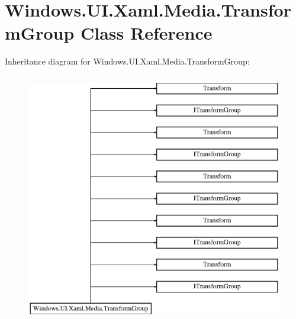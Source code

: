\hypertarget{class_windows_1_1_u_i_1_1_xaml_1_1_media_1_1_transform_group}{}\section{Windows.\+U\+I.\+Xaml.\+Media.\+Transform\+Group Class Reference}
\label{class_windows_1_1_u_i_1_1_xaml_1_1_media_1_1_transform_group}
Inheritance diagram for Windows.\+U\+I.\+Xaml.\+Media.\+Transform\+Group\+:\begin{figure}[H]
\begin{center}
\leavevmode
\includegraphics[height=11.000000cm]{class_windows_1_1_u_i_1_1_xaml_1_1_media_1_1_transform_group}
\end{center}
\end{figure}
